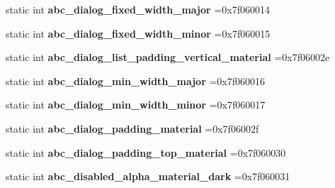 \begin{DoxyCompactItemize}
static int {\bfseries abc\+\_\+dialog\+\_\+fixed\+\_\+width\+\_\+major} =0x7f060014
\item 
\mbox{\label{classandroid_1_1support_1_1graphics_1_1drawable_1_1R_1_1dimen_a74be04debc0f06558cfe2ec59ebc1fb6}} 
static int {\bfseries abc\+\_\+dialog\+\_\+fixed\+\_\+width\+\_\+minor} =0x7f060015
\item 
\mbox{\label{classandroid_1_1support_1_1graphics_1_1drawable_1_1R_1_1dimen_ae16944ad21e8ece5b7a2e41aca69e6e6}} 
static int {\bfseries abc\+\_\+dialog\+\_\+list\+\_\+padding\+\_\+vertical\+\_\+material} =0x7f06002e
\item 
\mbox{\label{classandroid_1_1support_1_1graphics_1_1drawable_1_1R_1_1dimen_a95ff9e21591dd633a8832eef25bcbadf}} 
static int {\bfseries abc\+\_\+dialog\+\_\+min\+\_\+width\+\_\+major} =0x7f060016
\item 
\mbox{\label{classandroid_1_1support_1_1graphics_1_1drawable_1_1R_1_1dimen_a3bc42bc8d08f17a8d13b7128b1fd0180}} 
static int {\bfseries abc\+\_\+dialog\+\_\+min\+\_\+width\+\_\+minor} =0x7f060017
\item 
\mbox{\label{classandroid_1_1support_1_1graphics_1_1drawable_1_1R_1_1dimen_a5b767eff6454540d20aa44fe4310d781}} 
static int {\bfseries abc\+\_\+dialog\+\_\+padding\+\_\+material} =0x7f06002f
\item 
\mbox{\label{classandroid_1_1support_1_1graphics_1_1drawable_1_1R_1_1dimen_aa6cd87c4c0f3d53f95d36c0209723b6f}} 
static int {\bfseries abc\+\_\+dialog\+\_\+padding\+\_\+top\+\_\+material} =0x7f060030
\item 
\mbox{\label{classandroid_1_1support_1_1graphics_1_1drawable_1_1R_1_1dimen_a93e27a08cabd3942b21f32fcc2262878}} 
static int {\bfseries abc\+\_\+disabled\+\_\+alpha\+\_\+material\+\_\+dark} =0x7f060031
\item 

\end{DoxyCompactItemize}
